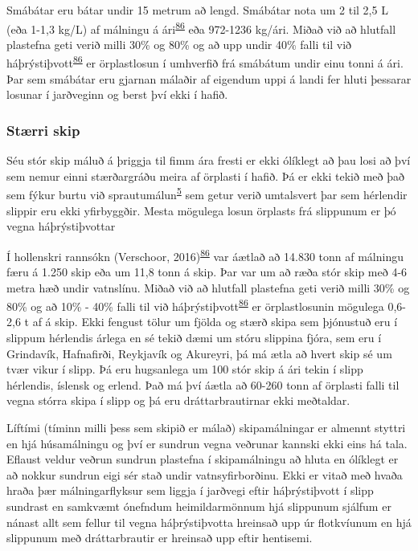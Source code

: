 \documentclass[icelandic,]{book}
\begin{document}
Smábátar eru bátar undir 15 metrum að lengd. Smábátar nota um 2 til 2,5 L (eða 1-1,3 kg/L) af málningu á ári\textsuperscript{\protect\hyperlink{ref-Verschoor2016}{86}} eða 972-1236 kg/ári. Miðað við að hlutfall plastefna geti verið milli 30\% og 80\% og að upp undir 40\% falli til við háþrýstiþvott\textsuperscript{\protect\hyperlink{ref-Verschoor2016}{86}} er örplastlosun í umhverfið frá smábátum undir einu tonni á ári. Þar sem smábátar eru gjarnan málaðir af eigendum uppi á landi fer hluti þessarar losunar í jarðveginn og berst því ekki í hafið.

\hypertarget{strri-skip}{%
\subsubsection*{Stærri skip}\label{strri-skip}}

Séu stór skip máluð á þriggja til fimm ára fresti er ekki ólíklegt að þau losi að því sem nemur einni stærðargráðu meira af örplasti í hafið. Þá er ekki tekið með það sem fýkur burtu við sprautumálun\textsuperscript{\protect\hyperlink{ref-OECD2009}{5}} sem getur verið umtalsvert þar sem hérlendir slippir eru ekki yfirbyggðir. Mesta mögulega losun örplasts frá slippunum er þó vegna háþrýstiþvottar

Í hollenskri rannsókn (Verschoor, 2016)\textsuperscript{\protect\hyperlink{ref-Verschoor2016}{86}} var áætlað að 14.830 tonn af málningu færu á 1.250 skip eða um 11,8 tonn á skip. Þar var um að ræða stór skip með 4-6 metra hæð undir vatnslínu. Miðað við að hlutfall plastefna geti verið milli 30\% og 80\% og að 10\% - 40\% falli til við háþrýstiþvott\textsuperscript{\protect\hyperlink{ref-Verschoor2016}{86}} er örplastlosunin mögulega 0,6-2,6 t af á skip. Ekki fengust tölur um fjölda og stærð skipa sem þjónustuð eru í slippum hérlendis árlega en sé tekið dæmi um stóru slippina fjóra, sem eru í Grindavík, Hafnafirði, Reykjavík og Akureyri, þá má ætla að hvert skip sé um tvær vikur í slipp. Þá eru hugsanlega um 100 stór skip á ári tekin í slipp hérlendis, íslensk og erlend. Það má því áætla að 60-260 tonn af örplasti falli til vegna stórra skipa í slipp og þá eru dráttarbrautirnar ekki meðtaldar.

Líftími (tíminn milli þess sem skipið er málað) skipamálningar er almennt styttri en hjá húsamálningu og því er sundrun vegna veðrunar kannski ekki eins há tala. Eflaust veldur veðrun sundrun plastefna í skipamálningu að hluta en ólíklegt er að nokkur sundrun eigi sér stað undir vatnsyfirborðinu. Ekki er vitað með hvaða hraða þær málningarflyksur sem liggja í jarðvegi eftir háþrýstiþvott í slipp sundrast en samkvæmt ónefndum heimildarmönnum hjá slippunum sjálfum er nánast allt sem fellur til vegna háþrýstiþvotta hreinsað upp úr flotkvíunum en hjá slippunum með dráttarbrautir er hreinsað upp eftir hentisemi.
\end{document}
